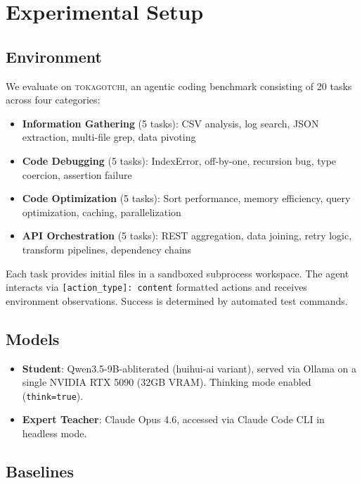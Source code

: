 \documentclass[11pt]{article}
\begin{document}
\section{Experimental Setup}
\label{sec:experiments}

\subsection{Environment}

We evaluate on \textsc{tokagotchi}, an agentic coding benchmark consisting of 20 tasks across four categories:
\begin{itemize}
    \item \textbf{Information Gathering} (5 tasks): CSV analysis, log search, JSON extraction, multi-file grep, data pivoting
    \item \textbf{Code Debugging} (5 tasks): IndexError, off-by-one, recursion bug, type coercion, assertion failure
    \item \textbf{Code Optimization} (5 tasks): Sort performance, memory efficiency, query optimization, caching, parallelization
    \item \textbf{API Orchestration} (5 tasks): REST aggregation, data joining, retry logic, transform pipelines, dependency chains
\end{itemize}

Each task provides initial files in a sandboxed subprocess workspace. The agent interacts via \texttt{[action\_type]: content} formatted actions and receives environment observations. Success is determined by automated test commands.

\subsection{Models}

\begin{itemize}
    \item \textbf{Student}: Qwen3.5-9B-abliterated (huihui-ai variant), served via Ollama on a single NVIDIA RTX 5090 (32GB VRAM). Thinking mode enabled (\texttt{think=true}).
    \item \textbf{Expert Teacher}: Claude Opus 4.6, accessed via Claude Code CLI in headless mode.
\end{itemize}

\subsection{Baselines}
\end{document}
